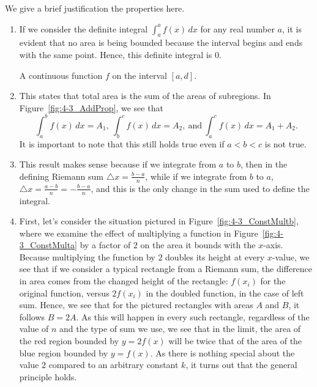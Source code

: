 We give a brief justification the properties here.
\begin{enumerate}[1)]
\item If we consider the definite integral $\int_a^a f(x) \, dx$ for any real number $a$, it is evident that no area is being bounded because the interval begins and ends with the same point.  Hence, this definite integral is $0$.
   
\begin{marginfigure} %
\caption{A continuous function $f$ on the interval $[a,d]$.} \label{fig:4-3_AddProp}
\end{marginfigure}
		
\item This states that total area is the sum of the areas of subregions. In Figure~\ref{fig:4-3_AddProp}, we see that  \small
$$\int_a^b f(x) \, dx = A_1, \ \int_b^c f(x) \, dx = A_2, \ \mbox{and} \ \int_a^c f(x) \, dx = A_1 + A_2.$$ \normalsize
It is important to note that this still holds true even if $a<b<c$ is not true. 

\item This result makes sense because if we integrate from $a$ to $b$, then in the defining Riemann sum $\triangle x = \frac{b-a}{n}$, while if we integrate from $b$ to $a$, $\triangle x = \frac{a-b}{n} = -\frac{b-a}{n}$, and this is the only change in the sum used to define the integral.

\item First, let's consider the situation pictured in Figure~\ref{fig:4-3_ConstMultb}, where we examine the effect of multiplying a function  in Figure~\ref{fig:4-3_ConstMulta} by a factor of $2$ on the area it bounds with the $x$-axis.  Because multiplying the function by $2$ doubles its height at every $x$-value, we see that if we consider a typical rectangle from a Riemann sum, the difference in area comes from the changed height of the rectangle:  $f(x_i)$ for the original function, versus $2f(x_i)$ in the doubled function, in the case of left sum.  Hence, we see that for the pictured rectangles with areas $A$ and $B$, it follows $B = 2A$.  As this will happen in every such rectangle, regardless of the value of $n$ and the type of sum we use, we see that in the limit, the area of the red region bounded by $y = 2f(x)$ will be twice that of the area of the blue region bounded by $y = f(x)$.  As there is nothing special about the value $2$ compared to an arbitrary constant $k$, it turns out that the general principle holds.


\end{enumerate}
